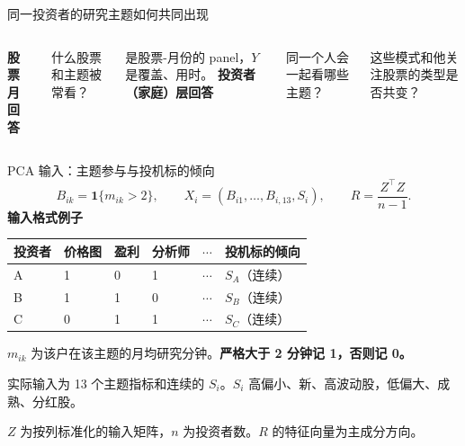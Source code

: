 \begin{frame}[label=pc-why]{同一投资者的研究主题如何共同出现}
  \begin{columns}[T,onlytextwidth]
    \textbf{股票月回答}\par\small
    什么股票和主题被常看？\par
    是股票-月份的 panel，\(Y\) 是覆盖、用时。
    \textbf{投资者（家庭）层回答}\par\footnotesize
    同一个人会一起看哪些主题？\par
    这些模式和他关注股票的类型是否共变？
  \end{columns}
  \medskip
  \medskip
\end{frame}

\begin{frame}[t,label=pc-input]{PCA 输入：主题参与与投机标的倾向}
  \vspace{-1.1em}
  \setlength{\abovedisplayskip}{3pt}
  \setlength{\belowdisplayskip}{4pt}
  \[
    B_{ik}=\mathbf{1}\{m_{ik}>2\},
    \qquad X_i=(B_{i1},\ldots,B_{i,13},S_i),
    \qquad R=\frac{Z^\top Z}{n-1}.
  \]
  \small
  \setlength{\parskip}{1pt}
  \renewcommand{\arraystretch}{1.06}
  \textbf{输入格式例子}\par\smallskip
  \begin{tabularx}{\linewidth}{@{}l*{4}{Y}L{.21\linewidth}@{}}
    \toprule 投资者 & 价格图 & 盈利 & 分析师 & \(\cdots\) & 投机标的倾向\\\midrule
    A & 1 & 0 & 1 & \(\cdots\) & \(S_A\)（连续）\\
    B & 1 & 1 & 0 & \(\cdots\) & \(S_B\)（连续）\\
    C & 0 & 1 & 1 & \(\cdots\) & \(S_C\)（连续）\\\bottomrule
  \end{tabularx}\par\smallskip
  \(m_{ik}\) 为该户在该主题的月均研究分钟。\textbf{严格大于 2 分钟记 1，否则记 0。}\par
  实际输入为 13 个主题指标和连续的 \(S_i\)。\(S_i\) 高偏小、新、高波动股，低偏大、成熟、分红股。\par
  \(Z\) 为按列标准化的输入矩阵，\(n\) 为投资者数。\(R\) 的特征向量为主成分方向。
\end{frame}

